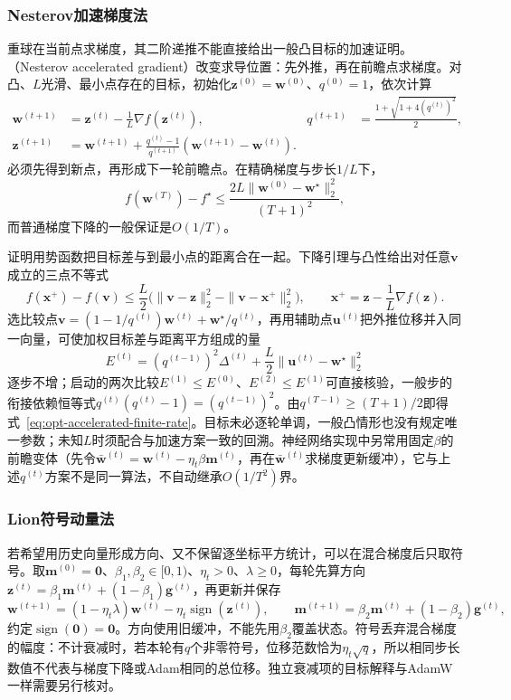 \subsubsection{Nesterov加速梯度法}

重球在当前点求梯度，其二阶递推不能直接给出一般凸目标的加速证明。（Nesterov accelerated gradient）改变求导位置：先外推，再在前瞻点求梯度。对凸、$L$光滑、最小点存在的目标，初始化$\bm z^{(0)}=\bm w^{(0)}$、$q^{(0)}=1$，依次计算
\begin{align*}
 \bm w^{(t+1)}&=\bm z^{(t)}-\frac1L\nabla f(\bm z^{(t)}),&
 q^{(t+1)}&=\frac{1+\sqrt{1+4(q^{(t)})^2}}2,\\
 \bm z^{(t+1)}&=\bm w^{(t+1)}
 +\frac{q^{(t)}-1}{q^{(t+1)}}(\bm w^{(t+1)}-\bm w^{(t)}).
\end{align*}
必须先得到新点，再形成下一轮前瞻点。在精确梯度与步长$1/L$下，
\begin{equation}
 f(\bm w^{(T)})-f^\star
 \leq\frac{2L\|\bm w^{(0)}-\bm w^\star\|_2^2}{(T+1)^2},
 \label{eq:opt-accelerated-finite-rate}
\end{equation}
而普通梯度下降的一般保证是$O(1/T)$。

证明用势函数把目标差与到最小点的距离合在一起。下降引理与凸性给出对任意$\bm v$成立的三点不等式
\[
 f(\bm x^+)-f(\bm v)
 \leq\frac L2\bigl(\|\bm v-\bm z\|_2^2-\|\bm v-\bm x^+\|_2^2\bigr),
 \qquad \bm x^+=\bm z-\frac1L\nabla f(\bm z).
\]
选比较点$\bm v=(1-1/q^{(t)})\bm w^{(t)}+\bm w^\star/q^{(t)}$，再用辅助点$\bm u^{(t)}$把外推位移并入同一向量，可使加权目标差与距离平方组成的量
\[
 E^{(t)}=(q^{(t-1)})^2\Delta^{(t)}
 +\frac L2\|\bm u^{(t)}-\bm w^\star\|_2^2
\]
逐步不增；启动的两次比较$E^{(1)}\leq E^{(0)}$、$E^{(2)}\leq E^{(1)}$可直接核验，一般步的衔接依赖恒等式$q^{(t)}(q^{(t)}-1)=(q^{(t-1)})^2$。由$q^{(T-1)}\geq(T+1)/2$即得式~\eqref{eq:opt-accelerated-finite-rate}。目标未必逐轮单调，一般凸情形也没有规定唯一参数；未知$L$时须配合与加速方案一致的回溯。神经网络实现中另常用固定$\beta$的前瞻变体（先令$\bar{\bm w}^{(t)}=\bm w^{(t)}-\eta_t\beta\bm m^{(t)}$，再在$\bar{\bm w}^{(t)}$求梯度更新缓冲），它与上述$q^{(t)}$方案不是同一算法，不自动继承$O(1/T^2)$界。

\subsubsection{Lion符号动量法}

若希望用历史向量形成方向、又不保留逐坐标平方统计，可以在混合梯度后只取符号。取$\bm m^{(0)}=\bm0$、$\beta_1,\beta_2\in[0,1)$、$\eta_t>0$、$\lambda\geq0$，每轮先算方向$\bm z^{(t)}=\beta_1\bm m^{(t)}+(1-\beta_1)\bm g^{(t)}$，再更新并保存
\[
 \bm w^{(t+1)}=(1-\eta_t\lambda)\bm w^{(t)}
 -\eta_t\operatorname{sign}(\bm z^{(t)}),\qquad
 \bm m^{(t+1)}=\beta_2\bm m^{(t)}+(1-\beta_2)\bm g^{(t)},
\]
约定$\operatorname{sign}(\bm0)=\bm0$。方向使用旧缓冲，不能先用$\beta_2$覆盖状态。符号丢弃混合梯度的幅度：不计衰减时，若本轮有$q$个非零符号，位移范数恰为$\eta_t\sqrt q$，所以相同步长数值不代表与梯度下降或Adam相同的总位移。独立衰减项的目标解释与AdamW一样需要另行核对。

